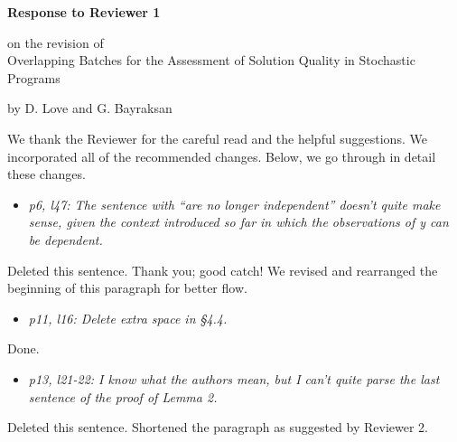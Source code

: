 \documentclass[11pt,notitlepage,onecolumn]{article}
\newcommand{\noi}{\noindent}
\begin{document}

\singlespacing

\baselineskip0.26in


\pagebreak

\begin{center}
\textbf{\Large Response to Reviewer 1} 
\medskip

on the revision of\\ 


{\large Overlapping Batches for the Assessment of Solution Quality in Stochastic Programs}
\medskip

{\footnotesize by D. Love and G. Bayraksan}
\end{center}

\bigskip


\noi
We thank the Reviewer for the careful read and the helpful suggestions. 
We incorporated all of the recommended changes. 
Below, we go through in detail these changes. 
\medskip

\bigskip 

\begin{itemize}
\item \textit{p6, l47: The sentence with ``are no longer independent'' doesn't quite make sense, given the context introduced so far in which the observations of y can be dependent.}
\end{itemize}

\noi 
Deleted this sentence. 
Thank you; good catch! 
We revised and rearranged the beginning of this paragraph for better flow.  
\medskip

\begin{itemize}
\item \textit{p11, l16: Delete extra space in \S4.4.}
\end{itemize}

\noi 
Done. 
\medskip



\begin{itemize}
\item \textit{p13, l21-22: I know what the authors mean, but I can't quite parse the last sentence of the proof of Lemma 2.}
\end{itemize}

\noi
Deleted this sentence. Shortened the paragraph as suggested by Reviewer 2. 
\medskip 
\end{document}
